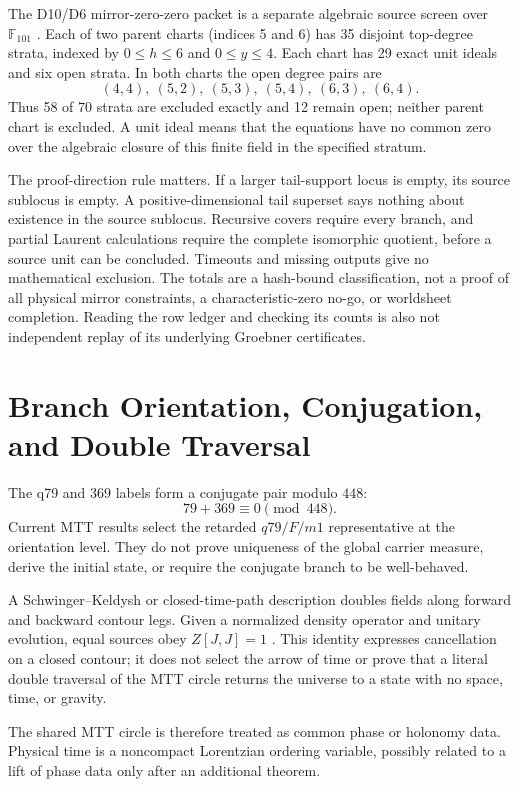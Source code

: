\documentclass[11pt]{article}
\begin{document}
The D10/D6 mirror-zero-zero packet is a separate algebraic source screen
over $\mathbb F_{101}$ \cite{FrozenMirror}. Each of two parent charts
(indices 5 and 6) has 35 disjoint top-degree strata, indexed by
$0\le h\le6$ and $0\le y\le4$. Each chart has 29 exact unit ideals
and six open strata. In both charts the open degree pairs are
\[
 (4,4),\ (5,2),\ (5,3),\ (5,4),\ (6,3),\ (6,4).
\]
Thus 58 of 70 strata are excluded exactly and 12 remain open; neither
parent chart is excluded. A unit ideal means that the equations have no
common zero over the algebraic closure of this finite field in the
specified stratum.

The proof-direction rule matters. If a larger tail-support locus is empty,
its source sublocus is empty. A positive-dimensional tail superset says
nothing about existence in the source sublocus. Recursive covers require
every branch, and partial Laurent calculations require the complete
isomorphic quotient, before a source unit can be concluded. Timeouts and
missing outputs give no mathematical exclusion. The totals are a
hash-bound classification, not a proof of all physical mirror constraints,
a characteristic-zero no-go, or worldsheet completion. Reading the row
ledger and checking its counts is also not independent replay of its
underlying Groebner certificates.

\section{Branch Orientation, Conjugation, and Double Traversal}

The q79 and \(369\) labels form a conjugate pair modulo \(448\):
\[
 79+369\equiv0\pmod{448}.
\]
Current MTT results select the retarded \(q79/F/m1\) representative at the
orientation level. They do not prove uniqueness of the global carrier
measure, derive the initial state, or require the conjugate branch to be
well-behaved.

A Schwinger--Keldysh or closed-time-path description doubles fields along
forward and backward contour legs. Given a normalized density operator and
unitary evolution, equal sources obey \(Z[J,J]=1\)
\cite{HaehlLoganayagamRangamani2017,CrossleyGloriosoLiu2017}. This identity
expresses cancellation on a closed contour; it does not select the arrow of
time or prove that a literal double traversal of the MTT circle returns the
universe to a state with no space, time, or gravity.

The shared MTT circle is therefore treated as common phase or holonomy data.
Physical time is a noncompact Lorentzian ordering variable, possibly related
to a lift of phase data only after an additional theorem.
\end{document}
